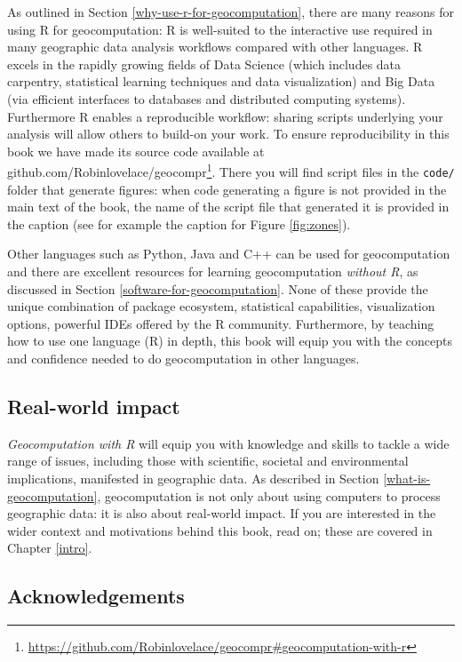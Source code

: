 \documentclass[]{krantz}
\let\rmarkdownfootnote\footnote%
\def\footnote{\protect\rmarkdownfootnote}
\renewcommand{\href}[2]{#2\footnote{\url{#1}}}
\begin{document}
As outlined in Section \ref{why-use-r-for-geocomputation}, there are many reasons for using R for geocomputation:
R is well-suited to the interactive use required in many geographic data analysis workflows compared with other languages.
R excels in the rapidly growing fields of Data Science (which includes data carpentry, statistical learning techniques and data visualization) and Big Data (via efficient interfaces to databases and distributed computing systems).
Furthermore R enables a reproducible workflow: sharing scripts underlying your analysis will allow others to build-on your work.
To ensure reproducibility in this book we have made its source code available at \href{https://github.com/Robinlovelace/geocompr\#geocomputation-with-r}{github.com/Robinlovelace/geocompr}.
There you will find script files in the \texttt{code/} folder that generate figures:
when code generating a figure is not provided in the main text of the book, the name of the script file that generated it is provided in the caption (see for example the caption for Figure \ref{fig:zones}).

Other languages such as Python, Java and C++ can be used for geocomputation and there are excellent resources for learning geocomputation \emph{without R}, as discussed in Section \ref{software-for-geocomputation}.
None of these provide the unique combination of package ecosystem, statistical capabilities, visualization options, powerful IDEs offered by the R community.
Furthermore, by teaching how to use one language (R) in depth, this book will equip you with the concepts and confidence needed to do geocomputation in other languages.

\hypertarget{real-world-impact}{%
\subsection*{Real-world impact}\label{real-world-impact}}

\emph{Geocomputation with R} will equip you with knowledge and skills to tackle a wide range of issues, including those with scientific, societal and environmental implications, manifested in geographic data.
As described in Section \ref{what-is-geocomputation}, geocomputation is not only about using computers to process geographic data:
it is also about real-world impact.
If you are interested in the wider context and motivations behind this book, read on; these are covered in Chapter \ref{intro}.

\hypertarget{acknowledgements}{%
\subsection*{Acknowledgements}\label{acknowledgements}}
\end{document}
